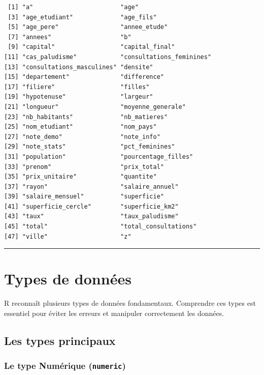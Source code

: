 \documentclass[
  french,
  11pt,
  a4paper,
]{article}
\begin{document}
\begin{verbatim}
 [1] "a"                        "age"                     
 [3] "age_etudiant"             "age_fils"                
 [5] "age_pere"                 "annee_etude"             
 [7] "annees"                   "b"                       
 [9] "capital"                  "capital_final"           
[11] "cas_paludisme"            "consultations_feminines" 
[13] "consultations_masculines" "densite"                 
[15] "departement"              "difference"              
[17] "filiere"                  "filles"                  
[19] "hypotenuse"               "largeur"                 
[21] "longueur"                 "moyenne_generale"        
[23] "nb_habitants"             "nb_matieres"             
[25] "nom_etudiant"             "nom_pays"                
[27] "note_demo"                "note_info"               
[29] "note_stats"               "pct_feminines"           
[31] "population"               "pourcentage_filles"      
[33] "prenom"                   "prix_total"              
[35] "prix_unitaire"            "quantite"                
[37] "rayon"                    "salaire_annuel"          
[39] "salaire_mensuel"          "superficie"              
[41] "superficie_cercle"        "superficie_km2"          
[43] "taux"                     "taux_paludisme"          
[45] "total"                    "total_consultations"     
[47] "ville"                    "z"                       
\end{verbatim}

\begin{center}\rule{0.5\linewidth}{0.5pt}\end{center}

\section{Types de données}\label{types-de-donnuxe9es}

R reconnaît plusieurs types de données fondamentaux. Comprendre ces
types est essentiel pour éviter les erreurs et manipuler correctement
les données.

\subsection{Les types principaux}\label{les-types-principaux}

\subsubsection{\texorpdfstring{Le type Numérique
(\texttt{numeric})}{Le type Numérique (numeric)}}\label{le-type-numuxe9rique-numeric}
\end{document}
